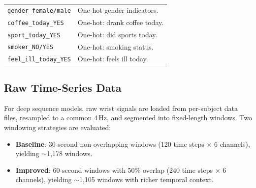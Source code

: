 \documentclass[11pt]{article}
\begin{document}
\begin{longtable}{@{}p{}p{}@{}}
\texttt{gender\_female/male} & One-hot gender indicators. \\
\texttt{coffee\_today\_YES} & One-hot: drank coffee today. \\
\texttt{sport\_today\_YES} & One-hot: did sports today. \\
\texttt{smoker\_NO/YES} & One-hot: smoking status. \\
\texttt{feel\_ill\_today\_YES} & One-hot: feels ill today. \\

\end{longtable}

\subsection{Raw Time-Series Data}
For deep sequence models, raw wrist signals are loaded from per-subject data files, resampled to a common 4\,Hz, and segmented into fixed-length windows.
Two windowing strategies are evaluated:
\begin{itemize}
    \item \textbf{Baseline}: 30-second non-overlapping windows (120 time steps $\times$ 6 channels), yielding $\sim$1{,}178 windows.
    \item \textbf{Improved}: 60-second windows with 50\% overlap (240 time steps $\times$ 6 channels), yielding $\sim$1{,}105 windows with richer temporal context.
\end{itemize}
\end{document}
